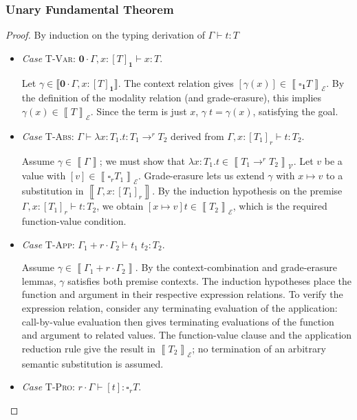 \documentclass[conference]{IEEEtran}
\newcommand\lam[2]{\lambda #1.#2}
\newcommand\gradedt[2]{\square_{#1} #2}
\newcommand\srzero{\textbf{0}}
\newcommand\srone{\textbf{1}}
\newcommand\calv{\mathcal{V}}
\newcommand\cale{\mathcal{E}}
\newcommand\bbrac[1]{\left\llbracket #1\right\rrbracket}
\begin{document}
\subsubsection{Unary Fundamental Theorem}

\begin{proof}
	By induction on the typing derivation of $\Gamma\vdash t:T$
	\begin{itemize}
		\item \emph{Case} \textsc{T-Var}: $\srzero\cdot\Gamma,x:[T]_\srone\vdash x:T$.
		
		Let $\gamma\in\llbracket\srzero\cdot\Gamma,x:[T]_\srone\rrbracket$. The context relation gives $[\gamma(x)]\in\bbrac{\gradedt{\srone}{T}}_\cale$. By the definition of the modality relation (and grade-erasure), this implies $\gamma(x)\in\bbrac{T}_\cale$. Since the term is just $x$, $\gamma\;t=\gamma(x)$, satisfying the goal.
		
		\item \emph{Case} \textsc{T-Abs}: $\Gamma\vdash\lam{x:T_1}{t}:T_1\to^r T_2$ derived from $\Gamma,x:[T_1]_r\vdash t:T_2$.
		
		Assume $\gamma\in\bbrac{\Gamma}$; we must show that $\lam{x:T_1}{t}\in\bbrac{T_1\to^r T_2}_\calv$. Let $v$ be a value with $[v]\in\bbrac{\gradedt{r}{T_1}}_\cale$. Grade-erasure lets us extend $\gamma$ with $x\mapsto v$ to a substitution in $\bbrac{\Gamma,x:[T_1]_r}$. By the induction hypothesis on the premise $\Gamma,x:[T_1]_r\vdash t:T_2$, we obtain $[x\mapsto v]t\in\bbrac{T_2}_\cale$, which is the required function-value condition.
		
		\item \emph{Case} \textsc{T-App}: $\Gamma_1+r\cdot\Gamma_2\vdash t_1\; t_2:T_2$.
		
		Assume $\gamma\in\bbrac{\Gamma_1+r\cdot\Gamma_2}$. By the context-combination and grade-erasure lemmas, $\gamma$ satisfies both premise contexts. The induction hypotheses place the function and argument in their respective expression relations. To verify the expression relation, consider any terminating evaluation of the application: call-by-value evaluation then gives terminating evaluations of the function and argument to related values. The function-value clause and the application reduction rule give the result in $\bbrac{T_2}_\cale$; no termination of an arbitrary semantic substitution is assumed.
		
		\item \emph{Case} \textsc{T-Pro}: $r\cdot\Gamma\vdash [t]:\gradedt{r}{T}$.
		

\end{itemize}
\end{proof}
\end{document}
